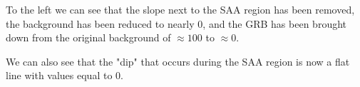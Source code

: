 \documentclass[11pt]{book} %
\begin{document}
To the left we can see that the slope next to the SAA region has been removed, the background has been reduced to nearly $0$, and the GRB has been brought down from the original background of $\approx 100$ to $\approx 0$.

We can also see that the "dip" that occurs during the SAA region is now a flat line with values equal to $0$.












\end{document}

